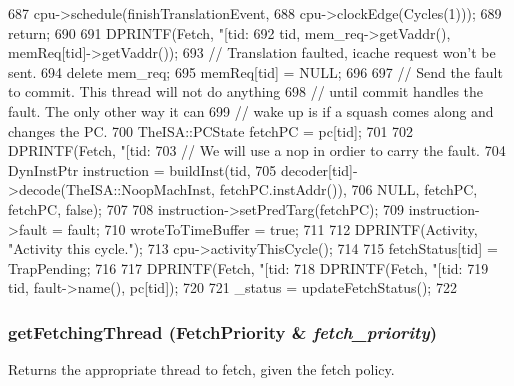 \begin{DoxyCode}
{{{687             cpu->schedule(finishTranslationEvent,
688                           cpu->clockEdge(Cycles(1)));
689             return;
690         }
691         DPRINTF(Fetch, "[tid:%
692                 tid, mem_req->getVaddr(), memReq[tid]->getVaddr());
693         // Translation faulted, icache request won't be sent.
694         delete mem_req;
695         memReq[tid] = NULL;
696 
697         // Send the fault to commit.  This thread will not do anything
698         // until commit handles the fault.  The only other way it can
699         // wake up is if a squash comes along and changes the PC.
700         TheISA::PCState fetchPC = pc[tid];
701 
702         DPRINTF(Fetch, "[tid:%
703         // We will use a nop in ordier to carry the fault.
704         DynInstPtr instruction = buildInst(tid,
705                 decoder[tid]->decode(TheISA::NoopMachInst, fetchPC.instAddr()),
706                 NULL, fetchPC, fetchPC, false);
707 
708         instruction->setPredTarg(fetchPC);
709         instruction->fault = fault;
710         wroteToTimeBuffer = true;
711 
712         DPRINTF(Activity, "Activity this cycle.\n");
713         cpu->activityThisCycle();
714 
715         fetchStatus[tid] = TrapPending;
716 
717         DPRINTF(Fetch, "[tid:%
718         DPRINTF(Fetch, "[tid:%
719                 tid, fault->name(), pc[tid]);
720     }
721     _status = updateFetchStatus();
722 }
\end{DoxyCode}
\hypertarget{classDefaultFetch_a4a20466270bc79a695af63ea67a35576}{
\subsubsection[{getFetchingThread}]{ getFetchingThread ({\bf FetchPriority} \& {\em fetch\_\-priority})}}
\label{classDefaultFetch_a4a20466270bc79a695af63ea67a35576}
Returns the appropriate thread to fetch, given the fetch policy. 


